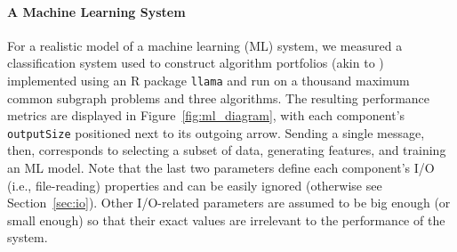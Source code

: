 \documentclass{article}
\begin{document}
\paragraph{A Machine Learning System}

For a realistic model of a machine learning (ML) system, we measured a
classification system used to construct algorithm portfolios (akin to
\cite{DBLP:conf/lion/KotthoffMS16}) implemented using an R package
\texttt{llama} \cite{kotthoff_llama_2013} and run on a thousand maximum common
subgraph problems and three algorithms. The resulting performance metrics are
displayed in Figure~\ref{fig:ml_diagram}, with each component's
\texttt{outputSize} positioned next to its outgoing arrow. Sending a single
message, then, corresponds to selecting a subset of data, generating features,
and training an ML model. Note that the last two parameters define each
component's I/O (i.e., file-reading) properties and can be easily ignored
(otherwise see Section~\ref{sec:io}). Other I/O-related parameters are assumed
to be big enough (or small enough) so that their exact values are irrelevant to
the performance of the system.
\end{document}

